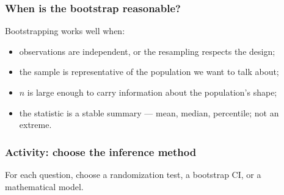 \documentclass[slidestop,compress,mathserif]{beamer}
\begin{document}
\begin{frame}
\frametitle{When is the bootstrap reasonable?}

Bootstrapping works well when:
{\small
\begin{itemize}
\item observations are independent, or the resampling respects the design;
\item the sample is representative of the population we want to talk about;
\item $n$ is large enough to carry information about the population's shape;
\item the statistic is a stable summary --- mean, median, percentile; not an extreme.
\end{itemize}}

\vspace{0.2em}

\end{frame}


\begin{frame}
\frametitle{Activity: choose the inference method}

For each question, choose a randomization test, a bootstrap CI, or a mathematical model.


\end{frame}

\end{document}
